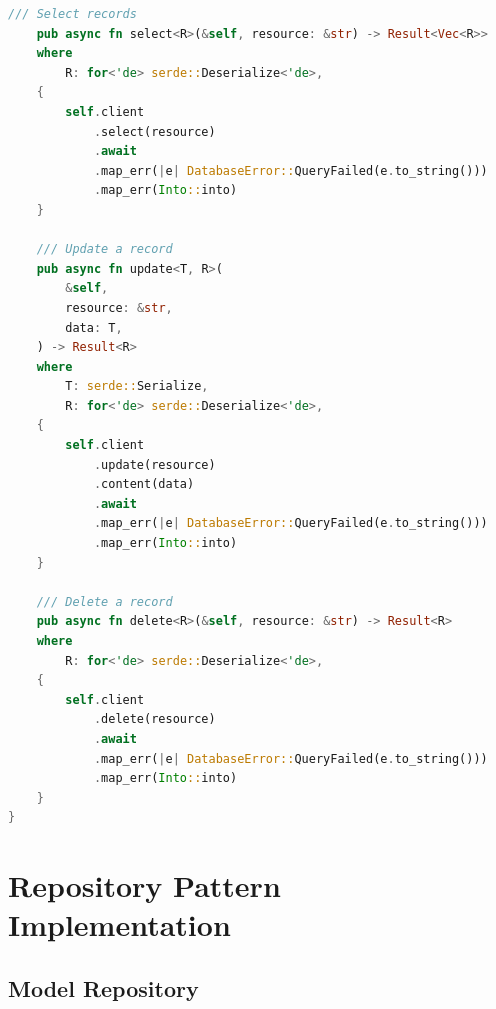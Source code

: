 \documentclass[12pt,a4paper,twoside]{report}
\begin{document}
\begin{lstlisting}[language=Rust,caption={Database Client - crates/gaussmeridian-db/src/lib.rs}]
    /// Select records
    pub async fn select<R>(&self, resource: &str) -> Result<Vec<R>>
    where
        R: for<'de> serde::Deserialize<'de>,
    {
        self.client
            .select(resource)
            .await
            .map_err(|e| DatabaseError::QueryFailed(e.to_string()))
            .map_err(Into::into)
    }
    
    /// Update a record
    pub async fn update<T, R>(
        &self,
        resource: &str,
        data: T,
    ) -> Result<R>
    where
        T: serde::Serialize,
        R: for<'de> serde::Deserialize<'de>,
    {
        self.client
            .update(resource)
            .content(data)
            .await
            .map_err(|e| DatabaseError::QueryFailed(e.to_string()))
            .map_err(Into::into)
    }
    
    /// Delete a record
    pub async fn delete<R>(&self, resource: &str) -> Result<R>
    where
        R: for<'de> serde::Deserialize<'de>,
    {
        self.client
            .delete(resource)
            .await
            .map_err(|e| DatabaseError::QueryFailed(e.to_string()))
            .map_err(Into::into)
    }
}
\end{lstlisting}

\section{Repository Pattern Implementation}

\subsection{Model Repository}
\end{document}
